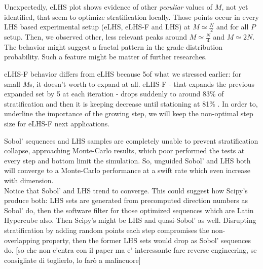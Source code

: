\documentclass[12pt]{extarticle}
\newcommand{\midcaption}[1]{
    \captionsetup{justification=centering}
    \caption{#1}
}
\begin{document}
Unexpectedly, eLHS plot shows evidence of other \textit{peculiar} values of $M$, not yet identified, that seem to optimize stratification locally. Those points occur in every LHS based experimental setup (eLHS, eLHS-F and LHS) at $M \simeq \frac{N}{2}$ and for all $P$ setup. Then, we observed other, less relevant peaks around $M \simeq \frac{N}{4}$ and $M \simeq 2N$. The behavior might suggest a fractal pattern in the grade distribution probability. Such a feature might be matter of further researches.

eLHS-F behavior differs from eLHS because 5of what we stressed earlier: for small $M$s, it doesn't worth to expand at all. eLHS-F - that expands the previous expanded set by 5 at each iteration - drops suddenly to around 83\% of stratification and then it is keeping decrease until stationing at 81\% . In order to, underline the importance of the growing step, we will keep the non-optimal step size for eLHS-F next applications.

Sobol' sequences and LHS samples are completely unable to prevent stratification collapse, approaching Monte-Carlo results, which poor performed the tests at every step and bottom limit the simulation. So, unguided Sobol' and LHS both will converge to a Monte-Carlo performance at a swift rate which even increase with dimension. \\ 
Notice that Sobol' and LHS trend to converge. This could suggest how Scipy's produce both: LHS sets are generated from precomputed direction numbers as Sobol' do, then the software filter for those optimized sequences which are Latin Hypercube also. Then Scipy's might be LHS and quasi-Sobol' as well. Disrupting stratification by adding random points each step compromises the non-overlapping property, then the former LHS sets would drop as Sobol' sequences do. [so che non c'entra con il paper ma e' interessante fare reverse engineering, se consigliate di toglierlo, lo farò a malincuore]

\begin{figure}[H]
    \centering
    \begin{subfigure}[b]{0.6\textwidth}
        \centering
    \end{subfigure}
    \begin{subfigure}[b]{0.6\textwidth}
        \centering
    \end{subfigure}
    \begin{subfigure}[b]{0.6\textwidth}
        \centering
    \end{subfigure}
    \midcaption{}
    \label{fig:exp1}
\end{figure}
\end{document}
